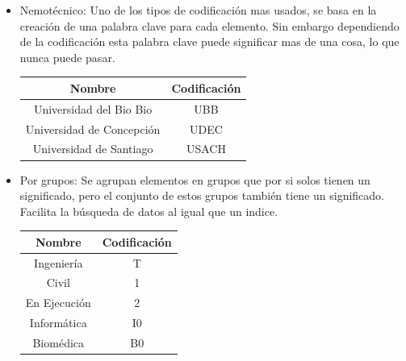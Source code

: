 \documentclass{templateNote}
\begin{document}
\begin{enumerate}
\begin{itemize}
\begin{itemize}
\begin{tcolorbox}[colback=green!10!white,colframe=green!75!black,title=Ejemplo de codificación de consonantes]
                \end{tcolorbox}
                \item Nemotécnico: Uno de los tipos de codificación mas usados, se basa en la creación de una palabra clave para cada elemento.
                Sin embargo dependiendo de la codificación esta palabra clave puede significar mas de una cosa, lo que nunca puede pasar.
                \begin{tcolorbox}[colback=green!10!white,colframe=green!75!black,title=Ejemplo de codificación Nemotécnica]
                    \begin{center}
                        \begin{tabular}{|c|c|}
                            \hline
                            \textbf{Nombre} & \textbf{Codificación} \\ \hline
                            Universidad del Bio Bio & UBB \\ \hline
                            Universidad de Concepción & UDEC \\ \hline
                            Universidad de Santiago & USACH \\ \hline
                        \end{tabular}
                    \end{center}
                \end{tcolorbox}
                \item Por grupos: Se agrupan elementos en grupos que por si solos tienen un significado, pero el conjunto de estos grupos también tiene un significado. Facilita la búsqueda de datos al igual que un indice.
                \begin{tcolorbox}[colback=green!10!white,colframe=green!75!black,title=Ejemplo de codificación Por grupos]
                    \begin{center}
                        \begin{tabular}{|c|c|}
                            \hline
                            \textbf{Nombre} & \textbf{Codificación} \\ \hline
                            Ingeniería & T \\ \hline
                            Civil & 1 \\ \hline
                            En Ejecución & 2 \\ \hline
                            Informática & I0 \\ \hline
                            Biomédica & B0 \\ \hline

\end{tabular}
\end{center}
\end{tcolorbox}
\end{itemize}
\end{itemize}
\end{enumerate}
\end{document}
